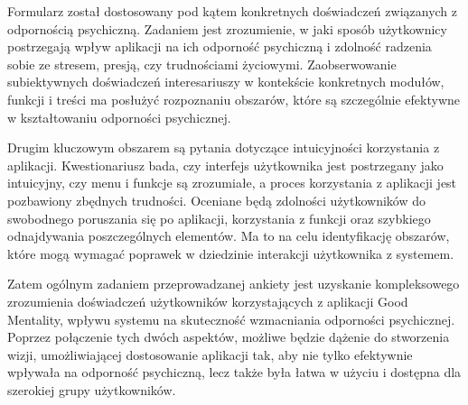 Formularz został dostosowany 
pod kątem konkretnych doświadczeń związanych z odpornością psychiczną.
Zadaniem jest zrozumienie, w jaki sposób użytkownicy postrzegają wpływ aplikacji
na ich odporność psychiczną i zdolność radzenia sobie ze stresem, presją,
czy trudnościami życiowymi. Zaobserwowanie subiektywnych doświadczeń interesariuszy
w kontekście konkretnych modułów, funkcji i treści ma posłużyć rozpoznaniu 
obszarów, które są szczególnie efektywne w kształtowaniu odporności psychicznej.

Drugim kluczowym obszarem są pytania dotyczące intuicyjności korzystania z 
aplikacji. Kwestionariusz bada, czy interfejs użytkownika jest postrzegany jako
intuicyjny, czy menu i funkcje są zrozumiałe, a proces korzystania z aplikacji
jest pozbawiony zbędnych trudności. Oceniane będą zdolności użytkowników do
swobodnego poruszania się po aplikacji, korzystania z funkcji oraz szybkiego
odnajdywania poszczególnych elementów. Ma to na celu identyfikację obszarów,
które mogą wymagać poprawek w dziedzinie interakcji użytkownika z systemem.

Zatem ogólnym zadaniem przeprowadzanej ankiety jest uzyskanie kompleksowego 
zrozumienia doświadczeń użytkowników korzystających z aplikacji Good Mentality, 
wpływu systemu na skuteczność wzmacniania odporności psychicznej. Poprzez
połączenie tych dwóch aspektów, możliwe będzie dążenie do stworzenia wizji,
umożliwiającej dostosowanie aplikacji tak, aby nie tylko efektywnie wpływała
na odporność psychiczną, lecz także była łatwa w użyciu i dostępna dla
szerokiej grupy użytkowników. 

